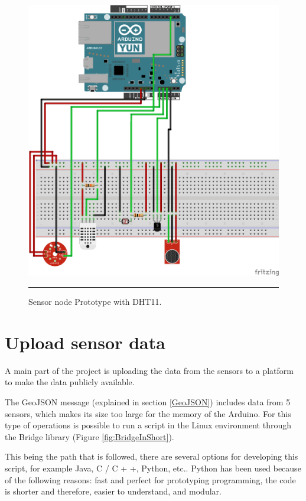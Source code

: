 \documentclass[12pt, a4paper,twoside]{tesi_upf}
\begin{document}
      \begin{figure}[!htbp]
          \centering
              \includegraphics[scale=0.8]{./Figures/Fritzing/AllSensors11_bb.png}
              \rule{25em}{0.5pt}
          \caption[Sensor node Prototype with DHT11]{Sensor node Prototype with DHT11.}
          \label{fig:AllSensors11_bb}
      \end{figure}
    
  \section{Upload sensor data}
  
    A main part of the project is uploading the data from the sensors to a platform to make the data publicly available.
    
    The GeoJSON message (explained in section \ref{GeoJSON}) includes data from 5 sensors, which makes its size too large for the memory of the Arduino.
    For this type of operations is possible to run a script in the Linux environment through the Bridge library (Figure \ref{fig:BridgeInShort}).
    
    This being the path that is followed, there are several options for developing this script, for example Java, C / C + +, Python, etc..
    Python has been used because of the following reasons: fast and perfect for prototyping programming, the code is shorter and therefore, easier to understand, and modular.
    
\end{document}
